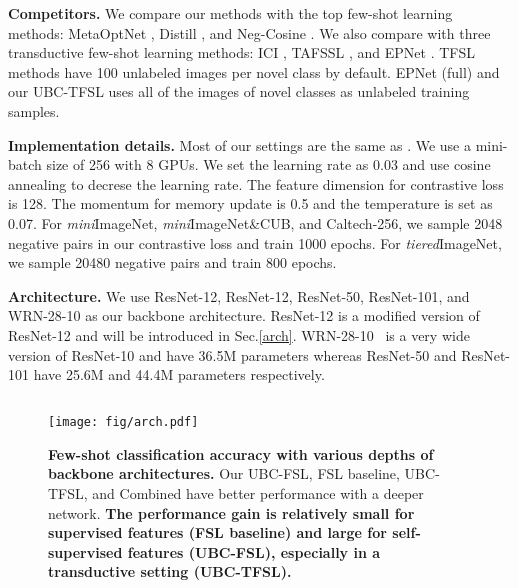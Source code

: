 \documentclass[final]{cvpr}
\makeatletter
\newcommand{\zt}[1]{{\color{black}{\@#1}}}
\newcommand{\subsecvspace}{\vspace{-0.0em}}
\newcommand{\figvspace}{\vspace{-0.2em}}
\newcommand{\captionvspace}{\vspace{-0.1em}}
\makeatother
\begin{document}
\textbf{Competitors.} We compare our methods with the top few-shot learning methods: MetaOptNet \cite{lee2019meta}, Distill \cite{tian2020rethinking}, and Neg-Cosine \cite{liu2020negative}.
We also compare with three transductive few-shot learning methods:
ICI \cite{Wang_2020_CVPR}, TAFSSL \cite{lichtenstein2020tafssl}, and EPNet \cite{rodriguez2020embedding}. TFSL methods have 100 unlabeled images per novel class by default. EPNet (full)
and our UBC-TFSL uses all of the images of novel classes as unlabeled training samples.

\textbf{Implementation details.} 
Most of our settings are the same as \cite{chen2020mocov2}. We use a mini-batch size of 256 with 8 GPUs. We set the learning rate as 0.03 and use cosine annealing to decrese the learning rate. The feature dimension for contrastive loss is 128. The momentum for memory update is 0.5 and the temperature is set as 0.07. For \emph{mini}ImageNet, \emph{mini}ImageNet\&CUB, and Caltech-256, we sample 2048 negative pairs in our contrastive loss and train 1000 epochs. For \emph{tiered}ImageNet, we sample 20480 negative pairs and train 800 epochs.


\textbf{Architecture.} We use ResNet-12, ResNet-12, ResNet-50, ResNet-101, and WRN-28-10 as our backbone architecture. ResNet-12 is a modified version of ResNet-12 and will be introduced in Sec.\cref{arch}. WRN-28-10~\cite{BMVC2016_87} is a very wide version of ResNet-10 and have 36.5M parameters whereas ResNet-50 and ResNet-101 have 25.6M and 44.4M parameters respectively. 


\subsecvspace
\subsection{\zt{Self-supervised learning can develop a strong inductive bias with no base-class labels} }
\subsecvspace
\label{alone}
\label{benchmark}





\begin{figure*}[t]
  \centering
  \texttt{[image: fig/arch.pdf]}
  \captionvspace
  \vspace{-0.2cm}
  \caption{\textbf{Few-shot classification accuracy with various depths of backbone architectures. } Our UBC-FSL, FSL baseline, UBC-TFSL, and Combined have better performance with a deeper network. 
  \textbf{The performance gain is relatively small for supervised features (FSL baseline) and large for self-supervised features (UBC-FSL), especially in a transductive setting (UBC-TFSL).}
}
  \label{fig:arch}
  \figvspace
\end{figure*}
\end{document}
